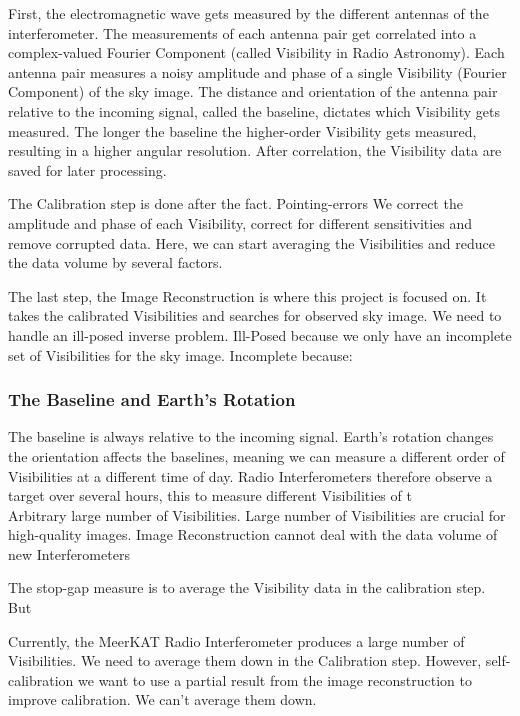 First, the electromagnetic wave gets measured by the different antennas of the interferometer. The measurements of each antenna pair get correlated into a complex-valued Fourier Component (called Visibility in Radio Astronomy). Each antenna pair measures a noisy amplitude and phase of a single Visibility (Fourier Component) of the sky image. The distance and orientation of the antenna pair relative to the incoming signal, called the baseline, dictates which Visibility gets measured. The longer the baseline the higher-order Visibility gets measured, resulting in a higher angular resolution. After correlation, the Visibility data are saved for later processing.

The Calibration step is done after the fact.
Pointing-errors
We correct the amplitude and phase of each Visibility, correct for different sensitivities and remove corrupted data.
Here, we can start averaging the Visibilities and reduce the data volume by several factors. 

The last step, the Image Reconstruction is where this project is focused on. It takes the calibrated Visibilities and searches for observed sky image. We need to handle an ill-posed inverse problem.
Ill-Posed because we only have an incomplete set of Visibilities for the sky image.
Incomplete because:

\subsubsection{The Baseline and Earth's Rotation}
The baseline is always relative to the incoming signal.
Earth's rotation changes the orientation affects the baselines, meaning we can measure a different order of Visibilities at a different time of day.
Radio Interferometers therefore observe a target over several hours, this to measure different Visibilities of t\\
Arbitrary large number of Visibilities. 
Large number of Visibilities are crucial for high-quality images.
Image Reconstruction cannot deal with the data volume of new Interferometers

The stop-gap measure is to average the Visibility data in the calibration step. But

Currently, the MeerKAT Radio Interferometer produces a large number of Visibilities. We need to average them down in the Calibration step. However, self-calibration we want to use a partial result from the image reconstruction to improve calibration. We can't average them down.

